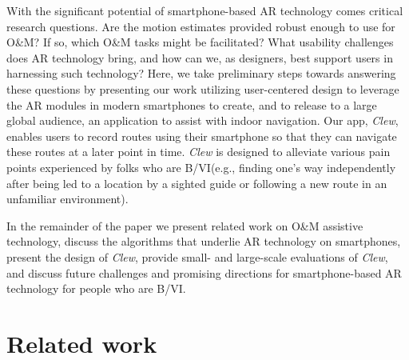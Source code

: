 \documentclass[chi_draft]{sigchi}
\newcommand{\BVI}{B/VI\xspace}
\newcommand{\OM}{O\&M\xspace}
\begin{document}
With the significant potential of smartphone-based AR technology comes critical research questions.  Are the motion estimates provided robust enough to use for \OM? If so, which \OM tasks might be facilitated?  What usability challenges does AR technology bring, and how can we, as designers, best support users in harnessing such technology?  Here, we take preliminary steps towards answering these questions by presenting our work utilizing user-centered design to leverage the AR modules in modern smartphones to create, and to release to a large global audience, an application to assist with indoor navigation.  Our app, \emph{Clew}, enables users to record routes using their smartphone so that they can navigate these routes at a later point in time.  \emph{Clew} is designed to alleviate various pain points experienced by folks who are \BVI (e.g., finding one's way independently after being led to a location by a sighted guide or following a new route in an unfamiliar environment).%

In the remainder of the paper we present related work on \OM assistive technology, discuss the algorithms that underlie AR technology on smartphones, present the design of \emph{Clew}, provide small- and large-scale evaluations of \emph{Clew}, and discuss future challenges and promising directions for smartphone-based AR technology for people who are \BVI.

\section{Related work}
\end{document}

